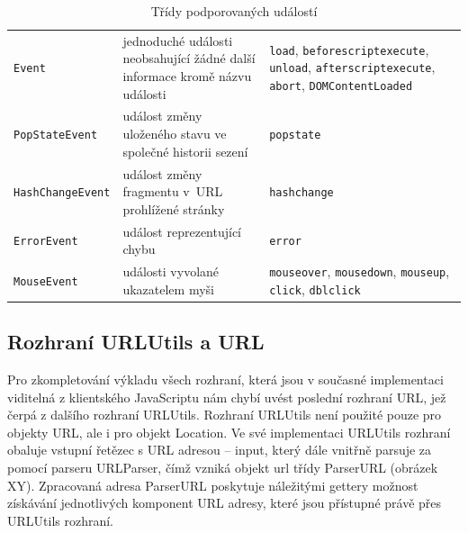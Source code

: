 \begin{table}[H]
  \begin{center} 
    \begin{tabular}{|l|p{5cm}|P{6cm}|} \hline
     &  &  \\ \hline
    \texttt{Event} & jednoduché události neobsahující žádné další informace kromě názvu události & \texttt{load}, \texttt{beforescriptexecute}, \mbox{\texttt{unload}}, \texttt{afterscriptexecute}, \texttt{abort}, \texttt{DOMContentLoaded} \\ \hline
    \texttt{PopStateEvent} & událost změny uloženého stavu ve společné historii sezení & \texttt{popstate} \\ \hline
    \texttt{HashChangeEvent} & událost změny fragmentu v~URL prohlížené stránky & \texttt{hashchange} \\ \hline
    \texttt{ErrorEvent} & událost reprezentující chybu & \texttt{error} \\ \hline
    \texttt{MouseEvent} & události vyvolané ukazatelem myši & \texttt{mouseover}, \texttt{mousedown}, \texttt{mouseup}, \texttt{click}, \texttt{dblclick} \\ \hline
    \end{tabular}
    \caption{Třídy podporovaných událostí}
    \label{Table.SupportedEvents}
  \end{center}
\end{table}

\subsection{Rozhraní URLUtils a URL}
\label{Chapter.Implementation.URLUtilsInterface}

Pro zkompletování výkladu všech rozhraní, která jsou v současné implementaci viditelná z klientského JavaScriptu nám chybí uvést poslední rozhraní URL, jež čerpá z dalšího rozhraní URLUtils. Rozhraní URLUtils není použité pouze pro objekty URL, ale i pro objekt Location. Ve své implementaci URLUtils rozhraní obaluje vstupní řetězec s URL adresou -- input, který dále vnitřně parsuje za pomocí parseru URLParser, čímž vzniká objekt url třídy ParserURL (obrázek XY). Zpracovaná adresa ParserURL poskytuje náležitými gettery možnost získávání jednotlivých komponent URL adresy, které jsou přístupné právě přes URLUtils rozhraní. 

